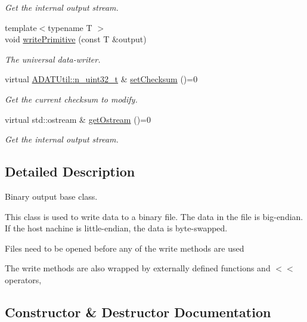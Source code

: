 \begin{DoxyCompactItemize}
\begin{DoxyCompactList}\small\item\em Get the internal output stream. \end{DoxyCompactList}\item 
{\footnotesize template$<$typename T $>$ }\\void \mbox{\hyperlink{classADATIO_1_1BinaryWriter_a4415e2d04de75ea6310a8eed3be8f43e}{write\+Primitive}} (const T \&output)
\begin{DoxyCompactList}\small\item\em The universal data-\/writer. \end{DoxyCompactList}\item 
virtual \mbox{\hyperlink{namespaceADATUtil_ad945a8afa4db2d1f89b731964adae97e}{A\+D\+A\+T\+Util\+::n\+\_\+uint32\+\_\+t}} \& \mbox{\hyperlink{classADATIO_1_1BinaryWriter_ae64230370824192d1f0dbcaa8e74017a}{set\+Checksum}} ()=0
\begin{DoxyCompactList}\small\item\em Get the current checksum to modify. \end{DoxyCompactList}\item 
virtual std\+::ostream \& \mbox{\hyperlink{classADATIO_1_1BinaryWriter_a4fe227341d17d012bb83a070c208dac0}{get\+Ostream}} ()=0
\begin{DoxyCompactList}\small\item\em Get the internal output stream. \end{DoxyCompactList}\end{DoxyCompactItemize}


\subsection{Detailed Description}
Binary output base class. 

This class is used to write data to a binary file. The data in the file is big-\/endian. If the host nachine is little-\/endian, the data is byte-\/swapped.

Files need to be opened before any of the write methods are used

The write methods are also wrapped by externally defined functions and $<$$<$ operators, 

\subsection{Constructor \& Destructor Documentation}
\mbox{\label{classADATIO_1_1BinaryWriter_ab3eb202f6fb06059cf4dd2eba12280cf}} 

